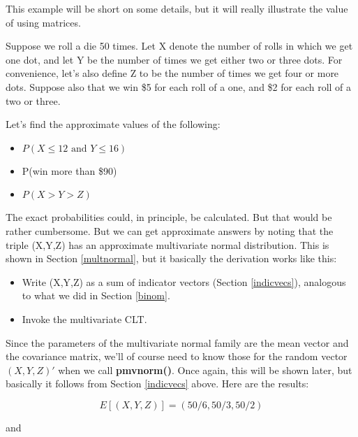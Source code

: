 This example will be short on some details, but it will really
illustrate the value of using matrices.

Suppose we roll a die 50 times.  Let X denote the number of rolls in
which we get one dot, and let Y be the number of times we get either two
or three dots.  For convenience, let's also define Z to be the number of
times we get four or more dots.  Suppose also that we win \$5 for each
roll of a one, and \$2 for each roll of a two or three. 

Let's find the approximate values of the following:

\begin{itemize}

\item $P(X \leq 12 \textrm{ and } Y \leq 16)$

\item P(win more than \$90)

\item $P(X > Y > Z)$

\end{itemize}

The exact probabilities could, in principle, be calculated.  But that
would be rather cumbersome.  But we can get approximate answers by
noting that the triple (X,Y,Z) has an approximate multivariate normal
distribution.  This is shown in Section \ref{multnormal}, but it
basically the derivation works like this:

\begin{itemize}

\item Write (X,Y,Z) as a sum of indicator vectors (Section
\ref{indicvecs}), analogous to what we did in Section \ref{binom}.

\item Invoke the multivariate CLT.

\end{itemize}

Since the parameters of the multivariate normal family are the mean
vector and the covariance matrix, we'll of course need to know those for
the random vector $(X,Y,Z)'$ when we call {\bf pmvnorm()}.  Once again,
this will be shown later, but basically it follows from Section
\ref{indicvecs} above.  Here are the results:

\begin{equation}
E[(X,Y,Z)] = (50/6, 50/3, 50/2)
\end{equation}

and

